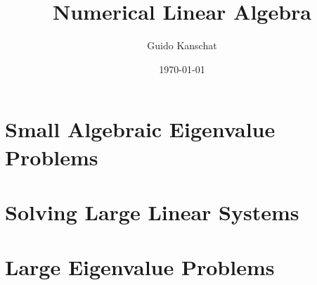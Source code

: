 \lstset{language=Python,numbers=left,resetmargins=true,xleftmargin=8pt,basicstyle=\small,numberstyle=\scriptsize}
\usetikzlibrary{svg.path}


\title{Numerical Linear Algebra}
\author{Guido Kanschat}
\date{\today}


\maketitle
\tableofcontents
\chapter{Small Algebraic Eigenvalue Problems}
%

\chapter{Solving Large Linear Systems}

\chapter{Large Eigenvalue Problems}




\printindex

